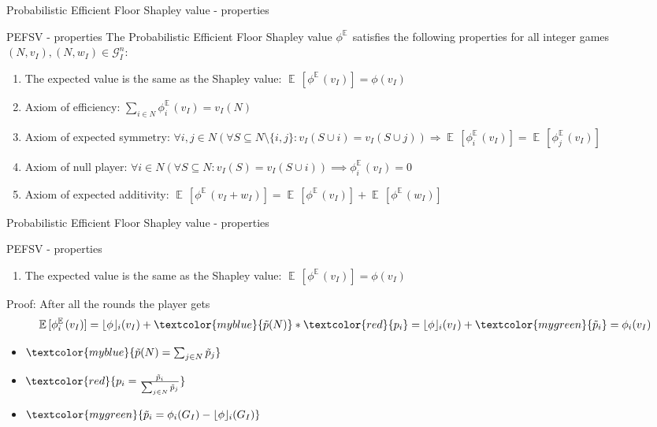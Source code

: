 \documentclass{beamer}
\newcommand{\red}[1]{\textcolor{red}{#1}}
\newcommand{\green}[1]{\textcolor{mygreen}{#1}}
\newcommand{\blue}[1]{\textcolor{myblue}{#1}}
\newcommand{\floor}[1]{\left\lfloor #1 \right\rfloor}
\newcommand{\floorphi}{\ensuremath{\floor{\phi}\hspace{-0.5ex}}}
\DeclareMathOperator{\E}{\mathbb{E}\,}
\begin{document}
\begin{frame}{Probabilistic Efficient Floor Shapley value - properties}
    \pause

    \begin{block}{PEFSV - properties}
        \pause
        The Probabilistic Efficient Floor Shapley value $\phi^{\E}$  satisfies the following properties for all integer games $(N,v_I),(N,w_I) \in \mathcal{G}_I^n$:
        \begin{enumerate}
            \pause
            \item The expected value is the same as the Shapley value: $\E[\phi^{\E}(v_I)] = \phi(v_I)$
            \pause
            \item Axiom of efficiency: $\sum_{i \in N}\phi_{i}^{\E}(v_I) = v_I(N)$
            \pause
            \item Axiom of expected symmetry: $\forall i,j \in N (\forall S \subseteq N \setminus \{i,j\}: v_I(S \cup i) = v_I(S \cup j)) \Rightarrow \E[\phi_{i}^{\E}(v_I)] = \E[\phi_{j}^{\E}(v_I)]$
            \pause
            \item Axiom of null player: $\forall i \in N(\forall S \subseteq N: v_I(S)=v_I(S \cup i)) \implies \phi_{i}^{\E}(v_I) = 0$
            \pause
            \item Axiom of expected additivity: $\E[\phi^{\E}(v_I+w_I)] = \E[\phi^{\E}(v_I)] + \E[\phi^{\E}(w_I)]$
        \end{enumerate}
    \end{block}

\end{frame}



\begin{frame}{Probabilistic Efficient Floor Shapley value - properties}
    \pause
    \begin{block}{PEFSV - properties}
        \begin{enumerate}
            \item The expected value is the same as the Shapley value: $\E[\phi^{\E}(v_I)] = \phi(v_I)$
        \end{enumerate}
    \end{block}
    \pause
    Proof: After all the rounds the player gets
    \pause
    \begin{displaymath}
        \E[\phi_{i}^{\E}(v_I)] = \floorphi_i(v_I) + \blue{\tilde{p}(N)} * \red{p_i} = \floorphi_i(v_I) + \green{\tilde{p}_i} = \phi_i(v_I)
    \end{displaymath}
    \begin{itemize}
        \pause
        \item $\blue{\tilde{p}(N) = \sum_{j \in N} \tilde{p}_j}$
        \pause
        \item $\red{p_i = \frac{\tilde{p}_i}{\sum_{j \in N} \tilde{p}_j}}$
        \pause
        \item $\green{\tilde{p}_i = \phi_i(G_I) - \floorphi_i(G_I)}$
    \end{itemize}
\end{frame}
\end{document}
